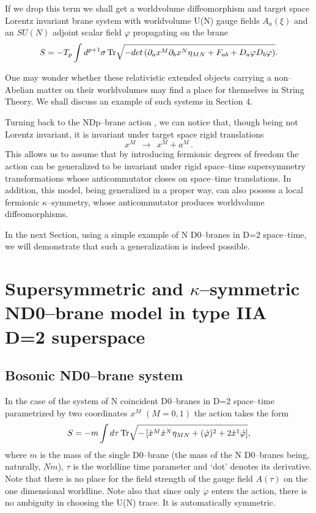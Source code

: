 \documentclass[a4paper,12pt]{article}
\begin{document}
If we drop this term we shall get a worldvolume diffeomorphism and
target space Lorentz invariant brane system with worldvolume U(N)
gauge fields
$A_a(\xi)$ and an
$SU(N)$ adjoint scalar field $\varphi$ propagating on the brane
\begin{equation}\label{9}
S=- T_p \int d^{p+1}\sigma\,{\rm Tr}
\sqrt{-det\left(
\partial_ax^M\partial_bx^N\eta_{MN}+ F_{ab}+ D_a\varphi D_b\varphi
\right)}.
\end{equation}

One may wonder whether these relativistic extended objects carrying
a non--Abelian matter on their worldvolumes may
find a place for themselves in String Theory. We shall discuss an
example of such systems in Section 4.

Turning back to the NDp--brane action , we can notice that,
though being not Lorentz invariant, it is invariant under target
space rigid translations
\begin{equation}\label{10}
x^M~~\rightarrow~~x^M+a^M\,.
\end{equation}
This allows us to assume that by introducing fermionic degrees of
freedom the action  can be generalized to be invariant under
rigid space--time supersymmetry transformations whose
anticommutator closes on space--time translations. In addition,
this model, being generalized in a proper way, can also possess a
local fermionic $\kappa$--symmetry, whose anticommutator produces
worldvolume diffeomorphisms.

In the next Section, using a simple example of N D0--branes in D=2
space--time, we will demonstrate that such a generalization is
indeed possible.

\section{Supersymmetric and $\kappa$--symmetric ND0--brane model
in type IIA D=2 superspace}

\subsection{Bosonic ND0--brane system}
In the case of the system of N coincident D0--branes in D=2
space--time parametrized by two coordinates $x^M$ $(M=0,1)$ the
action  takes the form
\begin{equation}\label{11}
S=- m \int d\tau\,{\rm Tr}
\sqrt{-\left[
\dot x^M\dot x^N\eta_{MN}+(\dot\varphi)^2 +
2\dot x^1 \dot\varphi\right]},
\end{equation}
where $m$ is the mass of the single D0--brane (the mass of the N
D0--branes being, naturally, $Nm$),
$\tau$ is the worldline time parameter and  `dot' denotes its
derivative. Note that there is no place for the field strength of
the gauge field
$A(\tau)$ on the one dimensional worldline. Note also that since
only
$\dot\varphi$ enters the action, there is no ambiguity in choosing
the U(N) trace. It is automatically symmetric.
\end{document}
